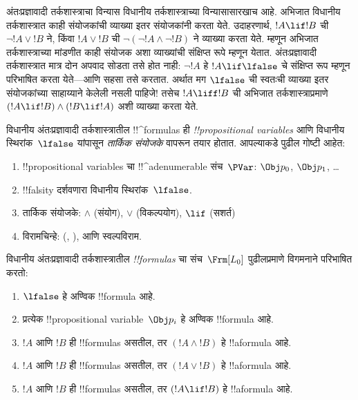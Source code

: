 \documentclass[../../../include/open-logic-section]{subfiles}
\begin{document}


अंतःप्रज्ञावादी तर्कशास्त्राचा विन्यास विधानीय
तर्कशास्त्राच्या विन्यासासारखाच आहे. अभिजात विधानीय
तर्कशास्त्रात काही संयोजकांची व्याख्या इतर
संयोजकांनी करता येते. उदाहरणार्थ, $!A \lif !B$ ची
$\lnot !A \lor !B$ ने, किंवा $!A \lor !B$ ची
$\lnot(\lnot !A \land \lnot !B)$ ने व्याख्या करता
येते. म्हणून अभिजात तर्कशास्त्राच्या मांडणीत काही
संयोजक अशा व्याख्यांची संक्षिप्त रूपे म्हणून येतात.
अंतःप्रज्ञावादी तर्कशास्त्रात मात्र दोन अपवाद सोडता
तसे होत नाही: $\lnot !A$ हे $!A \lif \lfalse$ चे
संक्षिप्त रूप म्हणून परिभाषित करता येते---आणि
सहसा तसे करतात. अर्थात मग $\lfalse$ ची स्वतःची
व्याख्या इतर संयोजकांच्या साहाय्याने केलेली नसली पाहिजे!{} तसेच
$!A \liff !B$ ची अभिजात तर्कशास्त्राप्रमाणे
$(!A \lif !B) \land (!B \lif !A)$ अशी व्याख्या
करता येते.

विधानीय अंतःप्रज्ञावादी तर्कशास्त्रातील !!^{formula}s
ही \emph{!!{propositional variable}s} आणि विधानीय
स्थिरांक~$\lfalse$ यांपासून \emph{तार्किक संयोजके}
वापरून तयार होतात. आपल्याकडे पुढील गोष्टी आहेत:

\begin{enumerate}
\item !!{propositional variable}s चा !!^a{denumerable} संच~$\PVar$: $\Obj p_0$,
  $\Obj p_1$, \dots
  \item !!{falsity} दर्शवणारा विधानीय स्थिरांक~$\lfalse$.
\item तार्किक संयोजके: $\land$
  (संयोग), $\lor$ (विकल्पयोग), $\lif$ (सशर्त)
\item विरामचिन्हे: (, ), आणि स्वल्पविराम.
\end{enumerate}

\begin{defn}[सूत्र]
 विधानीय अंतःप्रज्ञावादी
तर्कशास्त्रातील \emph{!!{formula}s} चा संच~$\Frm[L_0]$
पुढीलप्रमाणे विगमनाने परिभाषित करतो:
\begin{enumerate}
\item $\lfalse$ हे अण्विक !!{formula} आहे.

\item प्रत्येक !!{propositional variable}~$\Obj p_i$ हे अण्विक
  !!{formula} आहे.

\item $!A$ आणि $!B$ ही !!{formula}s असतील, तर $(!A \land
  !B)$ हे !!a{formula} आहे.

\item $!A$ आणि $!B$ ही !!{formula}s असतील, तर $(!A \lor !B)$
  हे !!a{formula} आहे.

\item $!A$ आणि $!B$ ही !!{formula}s असतील, तर $(!A \lif !B)$
  हे !!a{formula} आहे.

\end{enumerate}
\end{defn}
\end{document}
